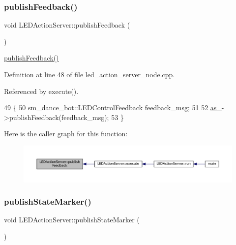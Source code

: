 \subsubsection{\texorpdfstring{publish\+Feedback()}{publishFeedback()}\hspace{0.1cm}{\footnotesize\ttfamily [3/3]}}
{\footnotesize\ttfamily void L\+E\+D\+Action\+Server\+::publish\+Feedback (\begin{DoxyParamCaption}{ }\end{DoxyParamCaption})\hspace{0.3cm}{\ttfamily [inline]}}

\hyperlink{classLEDActionServer_a25c93d4e7ecdacbb4f5b090d7789aa36}{publish\+Feedback()} 

Definition at line 48 of file led\+\_\+action\+\_\+server\+\_\+node.\+cpp.



Referenced by execute().


\begin{DoxyCode}
49 \{
50     sm\_dance\_bot::LEDControlFeedback feedback\_msg;
51     
52     \hyperlink{classLEDActionServer_a61d21c77642081acf017d4ebd65b2de0}{as\_}->publishFeedback(feedback\_msg);
53 \}
\end{DoxyCode}
Here is the caller graph for this function\+:
\nopagebreak
\begin{figure}[H]
\begin{center}
\leavevmode
\includegraphics[width=350pt]{classLEDActionServer_a25c93d4e7ecdacbb4f5b090d7789aa36_icgraph}
\end{center}
\end{figure}
\mbox{\label{classLEDActionServer_a73bb754ac2347c50660624ad92315895}} 
\subsubsection{\texorpdfstring{publish\+State\+Marker()}{publishStateMarker()}\hspace{0.1cm}{\footnotesize\ttfamily [1/3]}}
{\footnotesize\ttfamily void L\+E\+D\+Action\+Server\+::publish\+State\+Marker (\begin{DoxyParamCaption}{ }\end{DoxyParamCaption})\hspace{0.3cm}{\ttfamily [inline]}}

